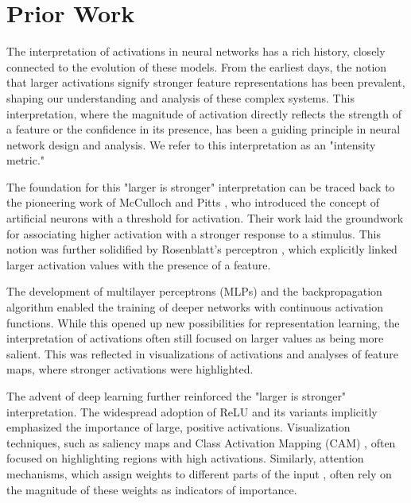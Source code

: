 \section{Prior Work}

The interpretation of activations in neural networks has a rich history, closely connected to the evolution of these models. \cite{lecun1998gradient} From the earliest days, the notion that larger activations signify stronger feature representations has been prevalent, shaping our understanding and analysis of these complex systems. \cite{erhan2009visualizing, lecun1998gradient, mcculloch1943logical, rosenblatt1958perceptron, rumelhart1986learning} This interpretation, where the magnitude of activation directly reflects the strength of a feature or the confidence in its presence, has been a guiding principle in neural network design and analysis. \cite{zeiler2014visualizing,yosinski2015understanding,olah2017feature}  We refer to this interpretation as an "intensity metric." \cite{simonyan2013deep}

The foundation for this "larger is stronger" interpretation can be traced back to the pioneering work of McCulloch and Pitts \cite{mcculloch1943logical}, who introduced the concept of artificial neurons with a threshold for activation. Their work laid the groundwork for associating higher activation with a stronger response to a stimulus. This notion was further solidified by Rosenblatt's perceptron \cite{rosenblatt1958perceptron}, which explicitly linked larger activation values with the presence of a feature. \cite{rosenblatt1958perceptron,olah2017feature}

The development of multilayer perceptrons (MLPs) and the backpropagation algorithm \cite{rumelhart1986learning} enabled the training of deeper networks with continuous activation functions. \cite{lecun1989backpropagation,hornik1989multilayer,glorot2011deep} While this opened up new possibilities for representation learning, the interpretation of activations often still focused on larger values as being more salient. This was reflected in visualizations of activations and analyses of feature maps, where stronger activations were highlighted. \cite{zeiler2014visualizing,yosinski2015understanding}

The advent of deep learning further reinforced the "larger is stronger" interpretation. \cite{krizhevsky2012imagenet} The widespread adoption of ReLU and its variants \cite{nair2010rectified,glorot2011deep} implicitly emphasized the importance of large, positive activations.  Visualization techniques, such as saliency maps \cite{simonyan2013deep} and Class Activation Mapping (CAM) \cite{zhou2016learning}, often focused on highlighting regions with high activations. Similarly, attention mechanisms, which assign weights to different parts of the input \cite{bahdanau2014neural,vaswani2017attention}, often rely on the magnitude of these weights as indicators of importance. 

